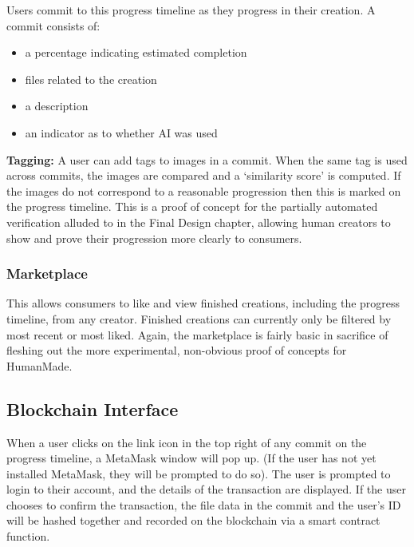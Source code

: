 \documentclass[12pt,a4paper]{article}
\begin{document}
Users commit to this progress timeline as they progress in their creation. A commit consists of:
\begin{itemize}
    \item a percentage indicating estimated completion
    \item files related to the creation
    \item a description
    \item an indicator as to whether AI was used
\end{itemize}
\textbf{Tagging:} A user can add tags to images in a commit. When the same tag is used across commits, the images are compared and a `similarity score' is computed. If the images do not correspond to a reasonable progression then this is marked on the progress timeline. This is a proof of concept for the partially automated verification alluded to in the Final Design chapter, allowing human creators to show and prove their progression more clearly to consumers.
\subsubsection{Marketplace}
This allows consumers to like and view finished creations, including the progress timeline, from any creator. Finished creations can currently only be filtered by most recent or most liked. Again, the marketplace is fairly basic in sacrifice of fleshing out the more experimental, non-obvious proof of concepts for HumanMade.
\subsection{Blockchain Interface}
When a user clicks on the link icon in the top right of any commit on the progress timeline, a MetaMask window will pop up. (If the user has not yet installed MetaMask, they will be prompted to do so). 
The user is prompted to login to their account, and the details of the transaction are displayed. If the user chooses to confirm the transaction, the file data in the commit and the user's ID will be hashed together and recorded on the blockchain via a smart contract function.  
\end{document}
